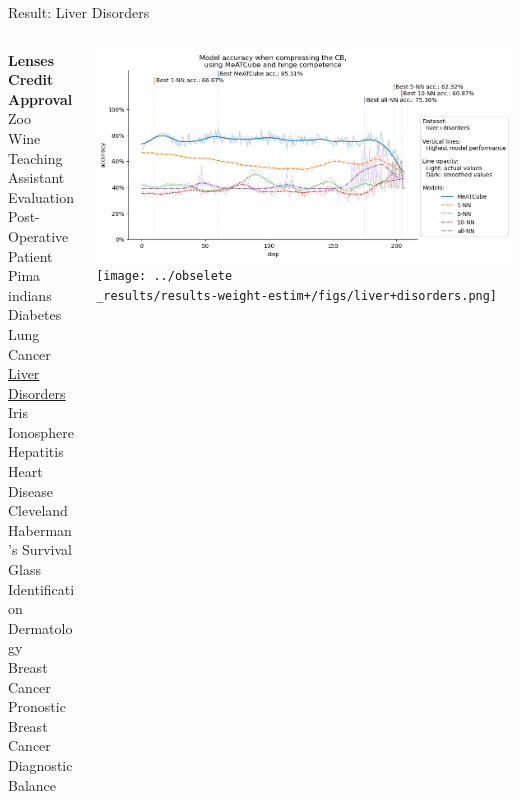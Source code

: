\documentclass[]{beamer}
\begin{document}
\begin{frame}{Result: Liver Disorders}
    \begin{columns}
        \begin{column}{.3\textwidth}
            {\smaller\smaller\smaller
            \textbf{Lenses} \\
            \textbf{Credit Approval} \\
            Zoo \\
            Wine \\
            Teaching Assistant Evaluation \\
            Post-Operative Patient \\
            Pima indians Diabetes \\
            Lung Cancer \\
            \underline{Liver Disorders} \\
            Iris \\
            Ionosphere \\
            Hepatitis \\
            Heart Disease Cleveland \\
            Haberman's Survival \\
            Glass Identification \\
            Dermatology \\
            Breast Cancer Pronostic \\
            Breast Cancer Diagnostic \\
            Balance\\
            ~}
        \end{column}
        \begin{column}{.7\textwidth}
            \includegraphics[width=\textwidth]{../results-no-sim-tuning+/figs/liver+disorders.png}
            \texttt{[image: ../obselete\\\_results/results-weight-estim+/figs/liver+disorders.png]}
        \end{column}
    \end{columns}
\end{frame}
\end{document}
